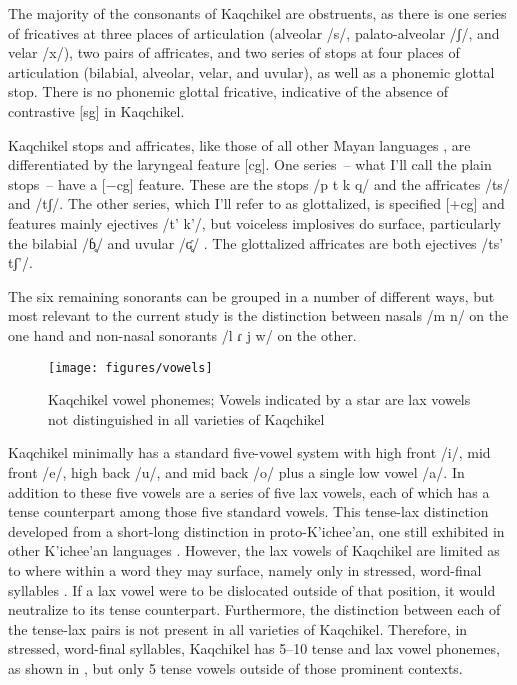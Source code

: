 \documentclass[output=paper,colorlinks,citecolor=brown]{langscibook}
\begin{document}
The majority of the consonants of Kaqchikel are obstruents, as there is one series of fricatives at three places of articulation (alveolar /s/, palato-alveolar /ʃ/, and velar /x/), two pairs of affricates, and two series of stops at four places of articulation (bilabial, alveolar, velar, and uvular), as well as a phonemic glottal stop. There is no phonemic glottal fricative, indicative of the absence of contrastive [sg] in Kaqchikel.

Kaqchikel stops and affricates, like those of all other Mayan languages \citep{Bennett:2016}, are differentiated by the laryngeal feature [cg]. One series~-- what I’ll call the plain stops~-- have a [−cg] feature. These are the stops /p t k q/ and the affricates /ts/ and /tʃ/. The other series, which I’ll refer to as glottalized, is specified [+cg] and features mainly ejectives /t’ k’/, but voiceless implosives do surface, particularly the bilabial /ɓ̥/ and uvular /ʛ̥/ \citep{patal_majzul_2000}. The glottalized affricates are both ejectives /ts’ tʃ’/.

The six remaining sonorants can be grouped in a number of different ways, but most relevant to the current study is the distinction between nasals /m n/ on the one hand and non-nasal sonorants /l ɾ j w/ on the other.


\begin{figure}
\texttt{[image: figures/vowels]}
\caption{Kaqchikel vowel phonemes; Vowels indicated by a star are lax vowels not distinguished in all varieties of Kaqchikel}
\label{vowels}
\end{figure}

Kaqchikel minimally has a standard five-vowel system with high front /i/, mid front /e/, high back /u/, and mid back /o/ plus a single low vowel /a/. In addition to these five vowels are a series of five lax vowels, each of which has a tense counterpart among those five standard vowels. This tense-lax distinction developed from a short-long distinction in proto-K’ichee’an, one still exhibited in other K’ichee’an languages \citep{Bennett:2016}. However, the lax vowels of Kaqchikel are limited as to where within a word they may surface, namely only in stressed, word-final syllables \citep{rill_2013}. If a lax vowel were to be dislocated outside of that position, it would neutralize to its tense counterpart. Furthermore, the distinction between each of the tense-lax pairs is not present in all varieties of Kaqchikel. Therefore, in stressed, word-final syllables, Kaqchikel has 5--10 tense and lax vowel phonemes, as shown in , but only 5 tense vowels outside of those prominent contexts.
\end{document}
